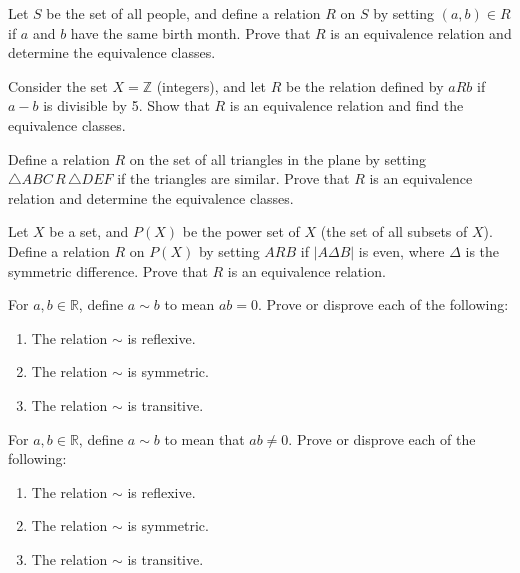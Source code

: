 \documentclass[11pt,paper=b5,footinclude,headinclude]{scrbook} %
\theoremstyle{remark}
\theoremstyle{definition} %
\theoremstyle{theorem} %
\newtheorem{ex}{Exercise\hypertarget{sol:\theex}}[chapter]
\begin{document}
\begin{ex}
Let \( S \) be the set of all people, and define a relation \( R \) on \( S \) by setting \( (a, b) \in R \) if \( a \) and \( b \) have the same birth month. Prove that \( R \) is an equivalence relation and determine the equivalence classes.
\end{ex}

\begin{ex}
Consider the set \( X = \mathbb{Z} \) (integers), and let \( R \) be the relation defined by \( aRb \) if \( a - b \) is divisible by 5. Show that \( R \) is an equivalence relation and find the equivalence classes.
\end{ex}

\begin{ex}
Define a relation \( R \) on the set of all triangles in the plane by setting \( \triangle ABC \,R\, \triangle DEF \) if the triangles are similar. Prove that \( R \) is an equivalence relation and determine the equivalence classes.
\end{ex}

\begin{ex}
Let \( X \) be a set, and \( P(X) \) be the power set of \( X \) (the set of all subsets of \( X \)). Define a relation \( R \) on \( P(X) \) by setting \( A R B \) if \( |A \Delta B| \) is even, where \( \Delta \) is the symmetric difference. Prove that \( R \) is an equivalence relation.
\end{ex}

\begin{ex}
For \( a, b \in \mathbb{R} \), define \( a \sim b \) to mean \( ab = 0 \). Prove or disprove each of the following:
\begin{enumerate}[label=\textit{(\alph*})]
    \item The relation \( \sim \) is reflexive.
    \item The relation \( \sim \) is symmetric.
    \item The relation \( \sim \) is transitive.
\end{enumerate}
\end{ex}

\begin{ex}
For \( a, b \in \mathbb{R} \), define \( a \sim b \) to mean that \( ab \neq 0 \). Prove or disprove each of the following:
\begin{enumerate}[label=\textit{(\alph*})]
    \item The relation \( \sim \) is reflexive.
    \item The relation \( \sim \) is symmetric.
    \item The relation \( \sim \) is transitive.
\end{enumerate}
\end{ex}
\end{document}
